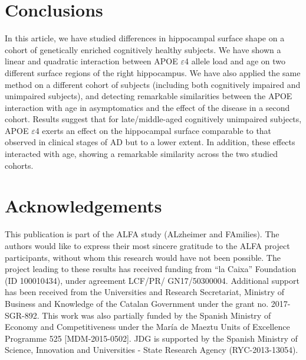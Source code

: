 \section{Conclusions}
\label{sec:conclusions}

In this article, we have studied differences in hippocampal surface shape on a cohort of genetically enriched cognitively healthy subjects. We have shown a linear and quadratic interaction between APOE $\varepsilon$4 allele load and age on two different surface regions of the right hippocampus. We have also applied the same method on a different cohort of subjects (including both cognitively impaired and unimpaired subjects), and detecting remarkable similarities between the APOE interaction with age in asymptomatics and the effect of the disease in a second cohort. Results suggest that for late/middle-aged cognitively unimpaired subjects, APOE $\varepsilon$4 exerts an effect on the hippocampal surface comparable to that observed in clinical stages of AD but to a lower extent. In addition, these effects interacted with age, showing a remarkable similarity across the two studied cohorts. \\

\section*{Acknowledgements}
This publication is part of the ALFA study (ALzheimer and FAmilies). The authors would like to express their most sincere gratitude to the ALFA project participants, without whom this research would have not been possible. The project leading to these results has received funding from “la Caixa” Foundation (ID 100010434), under agreement LCF/PR/ GN17/50300004. Additional support has been received from the Universities and Research Secretariat, Ministry of Business and Knowledge of the Catalan Government under the grant no. 2017-SGR-892. This work was also partially funded by the Spanish Ministry of Economy and Competitiveness under the María de Maeztu Units of Excellence Programme 525 [MDM-2015-0502]. JDG is supported by the Spanish Ministry of Science, Innovation and Universities - State Research Agency (RYC-2013-13054). 

